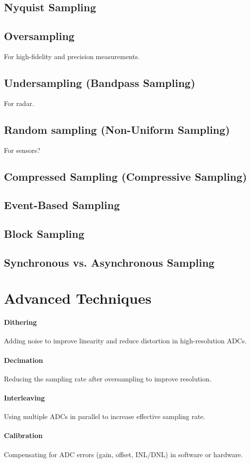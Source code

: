\subsection{Nyquist Sampling}

\subsection{Oversampling}
For high-fidelity and precision measurements.

\subsection{Undersampling (Bandpass Sampling)}
For radar.


\subsection{Random sampling (Non-Uniform Sampling)}
For sensors?


\subsection{Compressed Sampling (Compressive Sampling)}

\subsection{Event-Based Sampling}

\subsection{Block Sampling}

\subsection{Synchronous vs. Asynchronous Sampling}



\section{Advanced Techniques}

\paragraph{Dithering} Adding noise to improve linearity and reduce distortion in high-resolution ADCs.

\paragraph{Decimation} Reducing the sampling rate after oversampling to improve resolution.

\paragraph{Interleaving} Using multiple ADCs in parallel to increase effective sampling rate.

\paragraph{Calibration} Compensating for ADC errors (gain, offset, INL/DNL) in software or hardware.



